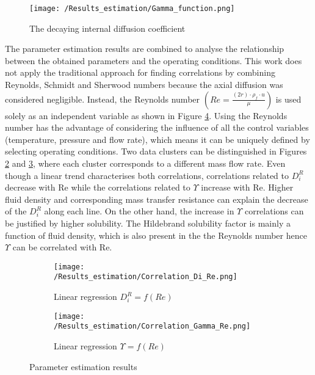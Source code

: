 \documentclass[../Supercritical_fluid_extraction_of_essential_oil_from_chamomile.tex]{subfiles}
\begin{document}
	\begin{figure}[!h]
		\centering
		\texttt{[image: /Results\_estimation/Gamma\_function.png]}
		\caption{The decaying internal diffusion coefficient}
		\label{fig: Gamma_function}
	\end{figure}
		
	The parameter estimation results are combined to analyse the relationship between the obtained parameters and the operating conditions. This work does not apply the traditional approach for finding correlations by combining Reynolds, Schmidt and Sherwood numbers because the axial diffusion was considered negligible. Instead, the Reynolds number $\left(Re = \frac{(2r) \cdot \rho_f \cdot u}{\mu}\right)$ is used solely as an independent variable as shown in Figure \ref{fig: Correlations}. Using the Reynolds number has the advantage of considering the influence of all the control variables (temperature, pressure and flow rate), which means it can be uniquely defined by selecting operating conditions.	
	Two data clusters can be distinguished in Figures \ref{fig: Correlations_Di_Re} and \ref{fig: Correlations_Gamma_Re}, where each cluster corresponds to a different mass flow rate. Even though a linear trend characterises both correlations, correlations related to $D_i^R$ decrease with Re while the correlations related to $\Upsilon$ increase with Re. Higher fluid density and corresponding mass transfer resistance can explain the decrease of the $D_i^R$ along each line. On the other hand, the increase in $\Upsilon$ correlations can be justified by higher solubility. The Hildebrand solubility factor is mainly a function of fluid density, which is also present in the the Reynolds number hence $\Upsilon$ can be correlated with Re.
	
	\begin{figure}[!h]
		\centering
		\begin{subfigure}[b]{\columnwidth}
			\centering
			\texttt{[image: /Results\_estimation/Correlation\_Di\_Re.png]}
			\caption{Linear regression $D_i^R = f(Re)$}
			\label{fig: Correlations_Di_Re}
		\end{subfigure}
		\hfill
		\begin{subfigure}[b]{\columnwidth}
			\centering
			\texttt{[image: /Results\_estimation/Correlation\_Gamma\_Re.png]}
			\caption{Linear regression $\Upsilon = f(Re)$}
			\label{fig: Correlations_Gamma_Re}
		\end{subfigure}
		\caption{Parameter estimation results}
		\label{fig: Correlations}
	\end{figure}
	
\end{document}

